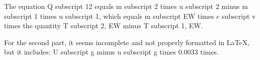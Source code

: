 The equation Q subscript 12 equals m subscript 2 times u subscript 2 minus m subscript 1 times u subscript 1, which equals m subscript EW times c subscript v times the quantity T subscript 2, EW minus T subscript 1, EW.

For the second part, it seems incomplete and not properly formatted in LaTeX, but it includes:
U subscript g minus u subscript g times 0.0033 times.